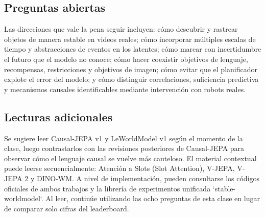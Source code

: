\documentclass[a4paper]{article}
\begin{document}
\subsection{Preguntas abiertas}

Las direcciones que vale la pena seguir incluyen: cómo descubrir y rastrear objetos de manera estable en videos reales; cómo incorporar múltiples escalas de tiempo y abstracciones de eventos en los latentes; cómo marcar con incertidumbre el futuro que el modelo no conoce; cómo hacer coexistir objetivos de lenguaje, recompensas, restricciones y objetivos de imagen; cómo evitar que el planificador explote el error del modelo; y cómo distinguir correlaciones, suficiencia predictiva y mecanismos causales identificables mediante intervención con robots reales.

\subsection{Lecturas adicionales}

Se sugiere leer Causal-JEPA v1 y LeWorldModel v1 según el momento de la clase, luego contrastarlos con las revisiones posteriores de Causal-JEPA para observar cómo el lenguaje causal se vuelve más cauteloso. El material contextual puede leerse secuencialmente: Atención a Slots (Slot Attention), V-JEPA, V-JEPA 2 y DINO-WM. A nivel de implementación, pueden consultarse los códigos oficiales de ambos trabajos y la librería de experimentos unificada `stable-worldmodel`. Al leer, continúe utilizando las ocho preguntas de esta clase en lugar de comparar solo cifras del leaderboard.
\end{document}
